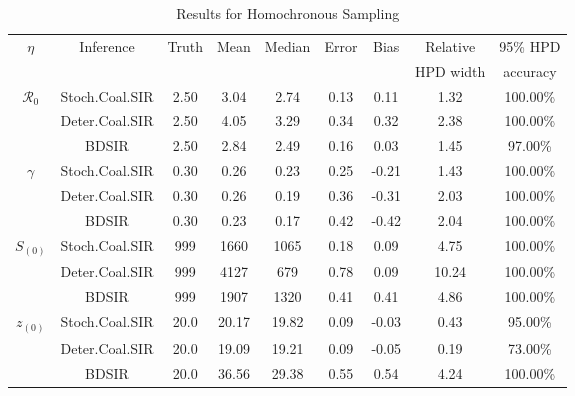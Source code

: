 \documentclass[10pt]{article}
\begin{document}
\begin{table}[!ht]
\begin{center}
\caption{\large{Results for Homochronous Sampling}}
\begin{tabular}{|c|c|c|c|c|c|c|c|c|}
\hline
$\eta$ & Inference & Truth & Mean & Median & Error & Bias & Relative & 95\% HPD \\ 
&  &  &  &  &  &  &  HPD width & accuracy \\ 
	\hline
	\hline
$\mathcal{R}_0$ & Stoch.Coal.SIR & 2.50 & 3.04 & 2.74 & 0.13 & 0.11 & 1.32 & 100.00\% \\
& Deter.Coal.SIR & 2.50 & 4.05 & 3.29 & 0.34 & 0.32 & 2.38 & 100.00\% \\
& BDSIR & 2.50 & 2.84 & 2.49 & 0.16 & 0.03 & 1.45 & 97.00\% \\
   \hline
   \hline 
$\gamma$ & Stoch.Coal.SIR & 0.30 & 0.26 & 0.23 & 0.25 & -0.21 & 1.43 & 100.00\% \\
& Deter.Coal.SIR & 0.30 & 0.26 & 0.19 & 0.36 & -0.31 & 2.03 & 100.00\% \\
& BDSIR & 0.30 & 0.23 & 0.17 & 0.42 & -0.42 & 2.04 & 100.00\% \\
   \hline
   \hline
$S_{(0)}$ & Stoch.Coal.SIR & 999 & 1660 & 1065 & 0.18 & 0.09 & 4.75 & 100.00\% \\
& Deter.Coal.SIR & 999 & 4127 & 679 & 0.78 & 0.09 & 10.24 & 100.00\% \\
& BDSIR & 999 & 1907 & 1320 & 0.41 & 0.41 & 4.86 & 100.00\% \\
   \hline
   \hline
$z_{(0)}$ & Stoch.Coal.SIR & 20.0 & 20.17 & 19.82 & 0.09 & -0.03 & 0.43 & 95.00\% \\
& Deter.Coal.SIR & 20.0 & 19.09 & 19.21 & 0.09 & -0.05 & 0.19 & 73.00\% \\
& BDSIR & 20.0 & 36.56 & 29.38 & 0.55 & 0.54 & 4.24 & 100.00\% \\
    \hline
\end{tabular}
\end{center}
\label{table:simDetCoalTrees}
 \end{table}
%
%
\clearpage
\end{document}

